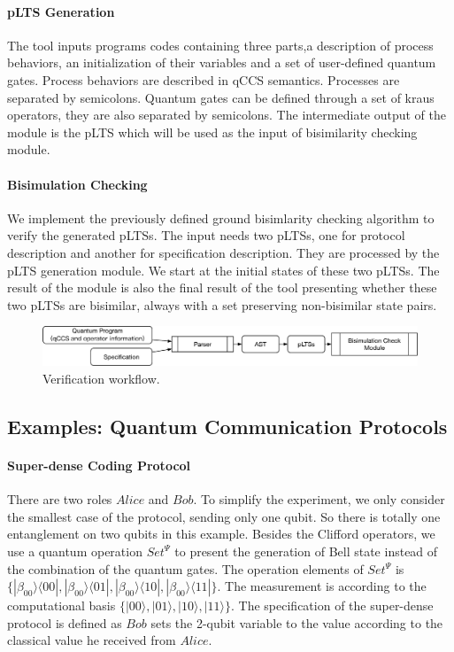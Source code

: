 \documentclass[a4paper,UKenglish,cleveref, autoref]{lipics-v2019}
\begin{document}
\paragraph*{pLTS Generation}
The tool inputs programs codes containing three parts,a description of process behaviors, an initialization of their variables and a set of user-defined quantum gates. Process behaviors are described in qCCS semantics. Processes are separated by semicolons. Quantum gates can be defined through a set of kraus operators, they are also separated by semicolons. The intermediate output of the module is the pLTS which will be used as the input of bisimilarity checking module.
\paragraph*{Bisimulation Checking}
We implement the previously defined ground bisimlarity checking algorithm to verify the generated pLTSs. The input needs two pLTSs, one for protocol description and another for specification description. They are processed by the pLTS generation module. We start at the initial states of these two pLTSs. The result of the module is also the final result of the tool presenting whether these two pLTSs are bisimilar, always with a set preserving non-bisimilar state pairs.
\begin{figure}
\centering
\includegraphics[width=\textwidth]{images/architecture.eps}
\caption{Verification workflow.}
\label{fig:arch}
\end{figure}
\subsection{Examples: Quantum Communication Protocols}
\paragraph*{Super-dense Coding Protocol} There are two roles $Alice$ and $Bob$. To simplify the experiment, we only consider the smallest case of the protocol, sending only one qubit. So there is totally one entanglement on two qubits in this example. Besides the Clifford operators, we use a quantum operation $Set^{\Psi}$ to present the generation of Bell state instead of the combination of the quantum gates. The operation elements of $Set^{\Psi}$ is $\{|\beta_{00}\rangle\langle00|,|\beta_{00}\rangle\langle01|,|\beta_{00}\rangle\langle10|,|\beta_{00}\rangle\langle11|\}$. The measurement is according to the computational basis $\{|00\rangle,|01\rangle,|10\rangle,|11\rangle\}$. The specification of the super-dense protocol is defined as $Bob$ sets the 2-qubit variable to the value according to the classical value he received from $Alice$.
\end{document}

